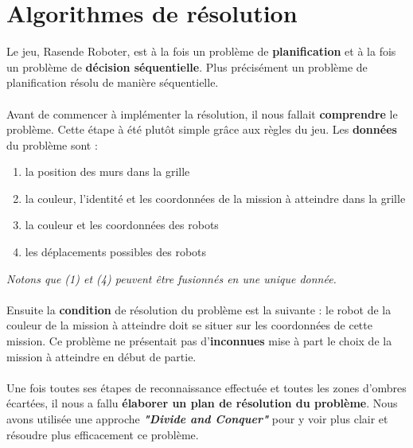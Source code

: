 \documentclass{article}
\begin{document}
\section{Algorithmes de résolution}
Le jeu, Rasende Roboter, est à la fois un problème de \textbf{planification} et à la fois un problème de \textbf{décision séquentielle}. Plus précisément un problème de planification résolu de manière séquentielle.\\\\
Avant de commencer à implémenter la résolution, il nous fallait \textbf{comprendre} le problème. Cette étape à été plutôt simple grâce aux règles du jeu. Les \textbf{données} du problème sont : 
\begin{enumerate}
\item  la position des murs dans la grille
\item  la couleur, l'identité et les coordonnées de la mission à atteindre dans la grille
\item  la couleur et les coordonnées des robots 
\item  les déplacements possibles des robots
\end{enumerate}
\textit{Notons que (1) et (4) peuvent être fusionnés en une unique donnée.}\\\\
Ensuite la \textbf{condition} de résolution du problème est la suivante : le robot de la couleur de la mission à atteindre doit se situer sur les coordonnées de cette mission. Ce problème ne présentait pas d'\textbf{inconnues} mise à part le choix de la mission à atteindre en début de partie.\\\\Une fois toutes ses étapes de reconnaissance effectuée et toutes les zones d'ombres écartées, il nous a fallu \textbf{élaborer un plan de résolution du problème}. Nous avons utilisée une approche \textit{\textbf{"Divide and Conquer"}} pour y voir plus clair et résoudre plus efficacement ce problème.
\end{document}
